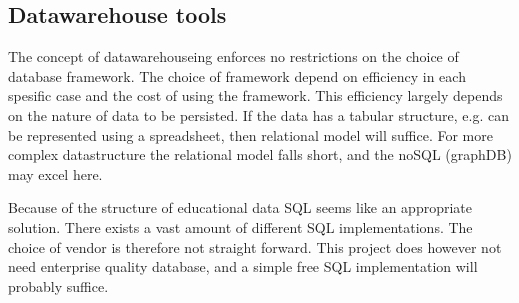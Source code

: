 \subsection{Datawarehouse tools}
The concept of datawarehouseing enforces no restrictions on the choice of database framework.
The choice of framework depend on efficiency in each spesific case and the cost of using the framework.
This efficiency largely depends on the nature of data to be persisted.
If the data has a tabular structure, e.g. can be represented using a spreadsheet, then relational model will suffice. 
For more complex datastructure the relational model falls short, and the noSQL (graphDB) may excel here. 

\bigskip\noindent
Because of the structure of educational data SQL seems like an appropriate solution. 
There exists a vast amount of different SQL implementations. 
The choice of vendor is therefore not straight forward. 
This project does however not need enterprise quality database, and a simple free SQL implementation will probably suffice. 




